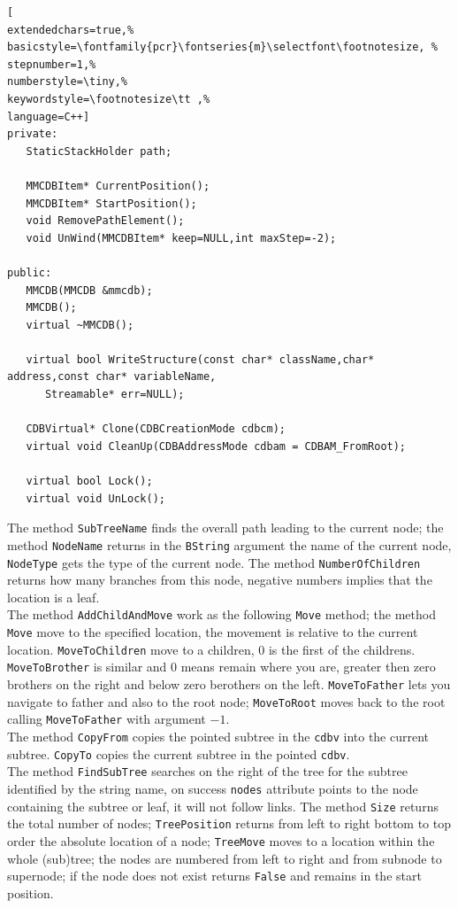 \begin{lstlisting}[
extendedchars=true,%
basicstyle=\fontfamily{pcr}\fontseries{m}\selectfont\footnotesize, %
stepnumber=1,%
numberstyle=\tiny,%
keywordstyle=\footnotesize\tt ,%
language=C++]
private:
   StaticStackHolder path;

   MMCDBItem* CurrentPosition();
   MMCDBItem* StartPosition();
   void RemovePathElement();
   void UnWind(MMCDBItem* keep=NULL,int maxStep=-2);

public:
   MMCDB(MMCDB &mmcdb);
   MMCDB();
   virtual ~MMCDB();

   virtual bool WriteStructure(const char* className,char* address,const char* variableName,
      Streamable* err=NULL);

   CDBVirtual* Clone(CDBCreationMode cdbcm);
   virtual void CleanUp(CDBAddressMode cdbam = CDBAM_FromRoot);

   virtual bool Lock();
   virtual void UnLock();
\end{lstlisting}

The method \texttt{SubTreeName} finds the overall path leading to the current node; the method \texttt{NodeName} returns in the \texttt{BString} argument the name of the current node, \texttt{NodeType} gets the type of the current node. The method \texttt{NumberOfChildren} returns how many branches from this node, negative numbers implies that the location is a leaf. \\


The method \texttt{AddChildAndMove} work as the following \texttt{Move} method; the method \texttt{Move} move to the specified location, the movement is relative to the current location. \texttt{MoveToChildren} move to a children, $0$ is the first of the childrens. \texttt{MoveToBrother} is similar and $0$ means remain where you are, greater then zero brothers on the right and below zero berothers on the left. \texttt{MoveToFather} lets you navigate to father and also to the root node; \texttt{MoveToRoot} moves back to the root calling \texttt{MoveToFather} with argument $-1$. \\


The method \texttt{CopyFrom} copies the pointed subtree in the \texttt{cdbv} into the current subtree. \texttt{CopyTo} copies the current subtree in the pointed \texttt{cdbv}. \\


The method \texttt{FindSubTree} searches on the right of the tree for the subtree identified by the string name, on success \texttt{nodes} attribute points to the node containing the subtree or leaf, it will not follow links.
The method \texttt{Size} returns the total number of nodes; \texttt{TreePosition} returns from left to right bottom to top order the absolute location of a node; \texttt{TreeMove} moves to a location within the whole (sub)tree; the nodes are numbered from left to right and from subnode to supernode; if the node does not exist returns \texttt{False} and remains in the start position. \\



